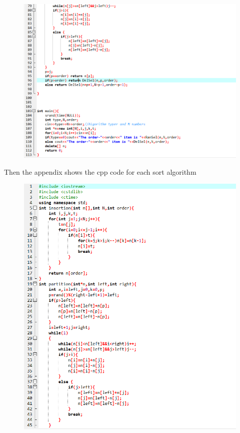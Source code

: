 \documentclass[12pt]{article}
\begin{document}
\begin{figure}[H]
\centering
\includegraphics[scale=0.6]{P6.png}
\end{figure}
Then the appendix shows the cpp code for each sort algorithm
\begin{figure}[H]
\centering
\includegraphics[scale=0.6]{P7.png}
\end{figure}
\end{document}
